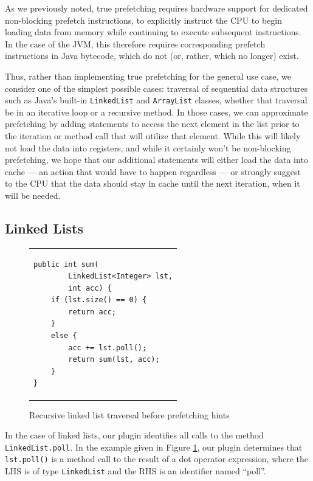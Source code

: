 \documentclass[journal]{IEEEtran}
\begin{document}
As we previously noted, true prefetching requires hardware support for dedicated non-blocking prefetch instructions, to explicitly instruct the CPU to begin loading data from memory while continuing to execute subsequent instructions. In the case of the JVM, this therefore requires corresponding prefetch instructions in Java bytecode, which do not (or, rather, which no longer) exist.

Thus, rather than implementing true prefetching for the general use case, we consider one of the simplest possible cases: traversal of sequential data structures such as Java's built-in \texttt{LinkedList} and \texttt{ArrayList} classes, whether that traversal be in an iterative loop or a recursive method. In those cases, we can approximate prefetching by adding statements to access the next element in the list prior to the iteration or method call that will utilize that element. While this will likely not load the data into registers, and while it certainly won't be non-blocking prefetching, we hope that our additional statements will either load the data into cache --- an action that would have to happen regardless --- or strongly suggest to the CPU that the data should stay in cache until the next iteration, when it will be needed.


\subsection{Linked Lists}

\begin{figure}[t]
{\begin{tabular}{@{\hspace{1.5em}}l}
\begin{lstlisting}
public int sum(
        LinkedList<Integer> lst,
        int acc) {
    if (lst.size() == 0) {
        return acc;
    }
    else {
        acc += lst.poll();
        return sum(lst, acc);
    }
}
\end{lstlisting}
\end{tabular}}
\caption{\small Recursive linked list traversal before prefetching hints}
\label{fig:llBefore}
\end{figure}

In the case of linked lists, our plugin identifies all calls to the method \texttt{LinkedList.poll}. In the example given in Figure \ref{fig:llBefore}, our plugin determines that \lstinline{lst.poll()} is a method call to the result of a dot operator expression, where the LHS is of type \texttt{LinkedList} and the RHS is an identifier named ``poll''.
\end{document}
